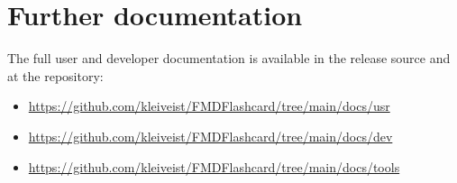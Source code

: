 \documentclass[11pt,a4paper]{article}
\begin{document}
\section{Further documentation}

The full user and developer documentation is available in the release source
and at the repository:
\begin{itemize}
  \item \url{https://github.com/kleiveist/FMDFlashcard/tree/main/docs/usr}
  \item \url{https://github.com/kleiveist/FMDFlashcard/tree/main/docs/dev}
  \item \url{https://github.com/kleiveist/FMDFlashcard/tree/main/docs/tools}
\end{itemize}
\end{document}
